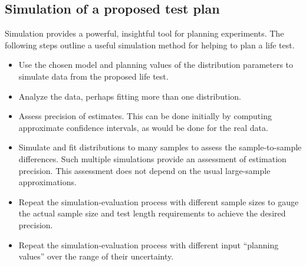 \subsection{Simulation of a proposed test plan}
\label{section.planning.simulation}
Simulation provides a powerful, insightful tool for planning
experiments. The following steps outline a useful simulation method for
helping to plan a life test.
\begin{itemize}
\item
Use the chosen model and planning values of the distribution parameters to
simulate data from the proposed life test.
\item
Analyze the data, perhaps fitting more than one distribution.
\item
Assess precision of estimates. This can be done initially by
computing approximate confidence intervals, as would be done for
the real data.
\item
Simulate and fit distributions to many samples to assess the
sample-to-sample differences.  Such multiple simulations provide an
assessment of estimation precision. This assessment does not
depend on the usual large-sample approximations.
\item
Repeat the simulation-evaluation process with different sample sizes
to gauge the actual sample size and test length
requirements to achieve the desired precision.
\item
Repeat the simulation-evaluation process with different
input ``planning values'' over the range of their uncertainty.
\end{itemize}

